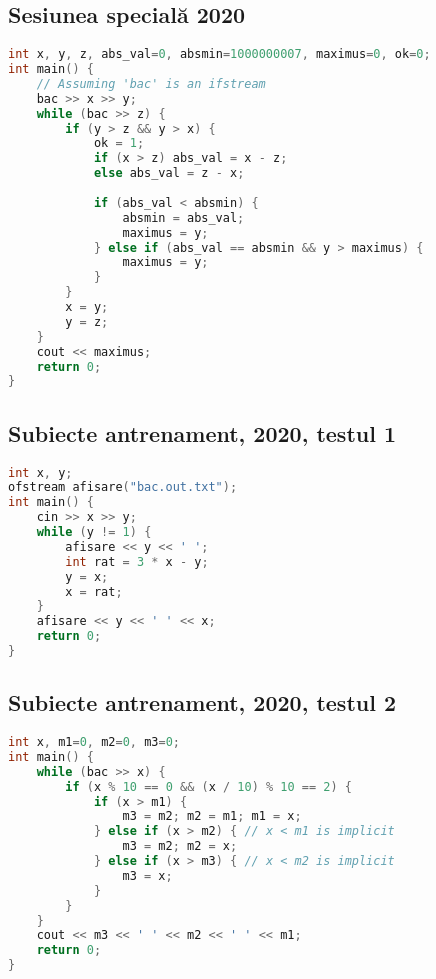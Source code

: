 \documentclass[10pt, a4paper, twocolumn]{article}
\begin{document}
\subsection*{Sesiunea specială 2020}
\begin{lstlisting}[language=C++]
int x, y, z, abs_val=0, absmin=1000000007, maximus=0, ok=0;
int main() {
    // Assuming 'bac' is an ifstream
    bac >> x >> y;
    while (bac >> z) {
        if (y > z && y > x) {
            ok = 1;
            if (x > z) abs_val = x - z;
            else abs_val = z - x;
            
            if (abs_val < absmin) {
                absmin = abs_val;
                maximus = y;
            } else if (abs_val == absmin && y > maximus) {
                maximus = y;
            }
        }
        x = y;
        y = z;
    }
    cout << maximus;
    return 0;
}
\end{lstlisting}
\vspace{0.5cm}

\subsection*{Subiecte antrenament, 2020, testul 1}
\begin{lstlisting}[language=C++]
int x, y;
ofstream afisare("bac.out.txt");
int main() {
    cin >> x >> y;
    while (y != 1) {
        afisare << y << ' ';
        int rat = 3 * x - y;
        y = x;
        x = rat;
    }
    afisare << y << ' ' << x;
    return 0;
}
\end{lstlisting}
\vspace{0.5cm}

\subsection*{Subiecte antrenament, 2020, testul 2}
\begin{lstlisting}[language=C++]
int x, m1=0, m2=0, m3=0;
int main() {
    while (bac >> x) {
        if (x % 10 == 0 && (x / 10) % 10 == 2) {
            if (x > m1) {
                m3 = m2; m2 = m1; m1 = x;
            } else if (x > m2) { // x < m1 is implicit
                m3 = m2; m2 = x;
            } else if (x > m3) { // x < m2 is implicit
                m3 = x;
            }
        }
    }
    cout << m3 << ' ' << m2 << ' ' << m1;
    return 0;
}
\end{lstlisting}
\vspace{0.5cm}
\end{document}
